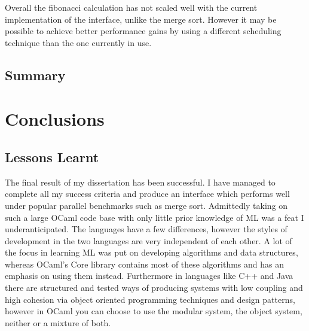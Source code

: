 \documentclass[12pt,twoside,notitlepage]{report}
\begin{document}
%
%

%
%
Overall the fibonacci calculation has not scaled well with the current implementation of the interface, unlike the merge sort. However it may be possible to achieve better performance gains by using a different scheduling technique
than the one currently in use.

\section{Summary}

\chapter{Conclusions}
\label{chap:conclusions}
%
%

%
%
\section{Lessons Learnt}
The final result of my dissertation has been successful. I have managed to complete all my success criteria and produce an interface which performs well under popular parallel benchmarks such as merge sort. Admittedly taking on such a
large OCaml code base with only little prior knowledge of ML was a feat I underanticipated. The languages have a few differences, however the styles of development in the two languages are very independent of each other. A lot of the
focus in learning ML was put on developing algorithms and data structures, whereas OCaml's Core library contains most of these algorithms and has an emphasis on using them instead. Furthermore in languages like C++ and Java there are
structured and tested ways of producing systems with low coupling and high cohesion via object oriented programming techniques and design patterns, however in OCaml you can choose to use the modular system, the object system, neither
or a mixture of both\cite{chailloux2000}. 
\end{document}
